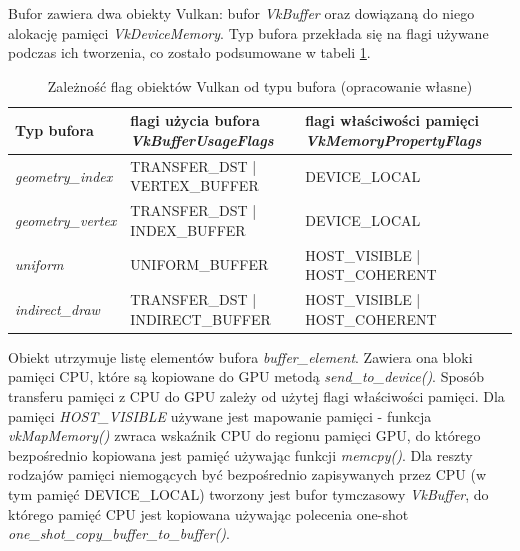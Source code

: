 Bufor zawiera dwa obiekty Vulkan: bufor \textit{VkBuffer} oraz dowiązaną do niego alokację pamięci \textit{VkDeviceMemory}.
Typ bufora przekłada się na flagi używane podczas ich tworzenia, co zostało podsumowane w tabeli \ref{params_buffer}.
\begin{table}[!htr]
	\centering
	\begin{tabular}{ |p{3cm}||>{\RaggedRight}p{4cm}|>{\RaggedRight}p{4cm}|}
		\hline
		Typ bufora & flagi użycia bufora \mbox{\textit{VkBufferUsageFlags}} & flagi właściwości pamięci \textit{VkMemoryPropertyFlags} \\
		\hline \hline
		\textit{geometry\_index} & \mbox{TRANSFER\_DST} | \mbox{VERTEX\_BUFFER} & DEVICE\_LOCAL \\
		\hline 
		\textit{geometry\_vertex} & \mbox{TRANSFER\_DST} | \mbox{INDEX\_BUFFER} & DEVICE\_LOCAL \\
		\hline 
		\textit{uniform} & \mbox{UNIFORM\_BUFFER} &  \mbox{HOST\_VISIBLE} | \mbox{HOST\_COHERENT} \\
		\hline 
		\textit{indirect\_draw} & \mbox{TRANSFER\_DST} | \mbox{INDIRECT\_BUFFER} &  \mbox{HOST\_VISIBLE} | \mbox{HOST\_COHERENT}\\
		\hline
	\end{tabular}
	\caption{Zależność flag obiektów Vulkan od typu bufora (opracowanie własne)} 
	\label{params_buffer}
\end{table}

Obiekt utrzymuje listę elementów bufora \textit{buffer\_element}. Zawiera ona bloki pamięci CPU, które są kopiowane do GPU metodą \textit{send\_to\_device()}.
Sposób transferu pamięci z CPU do GPU zależy od użytej flagi właściwości pamięci.
Dla pamięci \textit{HOST\_VISIBLE} używane jest mapowanie pamięci - funkcja \textit{vkMapMemory()} zwraca wskaźnik CPU do regionu pamięci GPU, do którego bezpośrednio kopiowana jest pamięć używając funkcji \textit{memcpy()}.
Dla reszty rodzajów pamięci niemogących być bezpośrednio zapisywanych przez CPU (w tym pamięć DEVICE\_LOCAL) tworzony jest bufor tymczasowy \textit{VkBuffer}, do którego pamięć CPU jest kopiowana używając polecenia one-shot \textit{one\_shot\_copy\_buffer\_to\_buffer()}.


